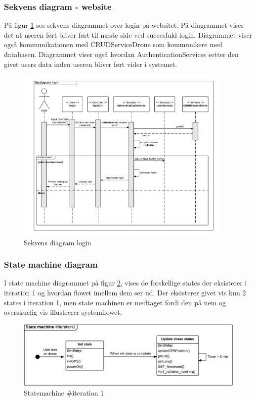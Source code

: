 \subsubsection*{Sekvens diagram - website}
På figur \ref{fig:Sekvens_diagram_login} ses sekvens diagrammet over login på websitet. På diagrammet vises det at useren ført bliver ført til næste side ved succesfuld login. Diagrammet viser også kommunikationen med CRUDServiceDrone som kommunikere med databasen. Diagrammet viser også hvordan AuthenticationServices setter den givet users data inden useren bliver ført vider i systemet.
\begin{figure}[H]
	\centering
	\includegraphics[width=0.93\textwidth]{Billeder/sekvens/login_sq_diagram.png}
	\caption{Sekvens diagram login}
	\label{fig:Sekvens_diagram_login}
\end{figure}
\newpage

\subsubsection*{State machine diagram}
\vspace{-0.1cm}
I state machine diagrammet på figur \ref{fig:Statemachine_iteration1}, vises de forskellige states der eksisterer i iteration 1 og hvordan flowet imellem dem ser ud. Der eksisterer givet vis kun 2 states i iteration 1, men state machinen er medtaget fordi den på nem og overskuelig vis illustrerer systemflowet.
\begin{figure}[H]
	\centering
	\includegraphics[width=1\textwidth]{Billeder/statemachine/State_iteration1.png}
	\vspace{-0.5cm}
	\caption{Statemachine \#iteration 1}
	\label{fig:Statemachine_iteration1}
\end{figure}
\newpage

